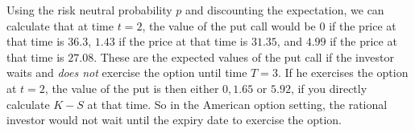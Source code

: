 \documentclass[letterpaper,12pt]{article}
\theoremstyle{plain}
\numberwithin{equation}{section}
\begin{document}
\begin{figure}[H]
\centering
\usetikzlibrary{matrix}
\end{figure}
Using the risk neutral probability $p$ and discounting the expectation, we can calculate that at time $t = 2$, the value of the put call would be $0$ if the price at that time is $36.3$, $1.43$ if the price at that time is $31.35$, and $4.99$ if the price at that time is $27.08$. These are the expected values of the put call if the investor waits and {\em does not} exercise the option until time $T=3$. If he exercises the option at $t = 2$, the value of the put is then either $0, 1.65$ or $5.92$, if you directly calculate $K - S$ at that time. So in the American option setting, the rational investor would not wait until the expiry date to exercise the option.
\end{document}
